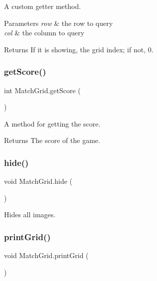 A custom getter method. 


\begin{DoxyParams}{Parameters}
{\em row} & the row to query \\
\hline
{\em col} & the column to query \\
\hline
\end{DoxyParams}
\begin{DoxyReturn}{Returns}
If it is showing, the grid index; if not, 0. 
\end{DoxyReturn}
\mbox{\label{class_match_grid_a39fcc7cc9b094d95d2aee459c9e287df}} 
\subsubsection{\texorpdfstring{get\+Score()}{getScore()}}
{\footnotesize\ttfamily int Match\+Grid.\+get\+Score (\begin{DoxyParamCaption}{ }\end{DoxyParamCaption})}



A method for getting the score. 

\begin{DoxyReturn}{Returns}
The score of the game. 
\end{DoxyReturn}
\mbox{\label{class_match_grid_ada04481d2f01ef0011a7bb4707d2b911}} 
\subsubsection{\texorpdfstring{hide()}{hide()}}
{\footnotesize\ttfamily void Match\+Grid.\+hide (\begin{DoxyParamCaption}{ }\end{DoxyParamCaption})}



Hides all images. 

\mbox{\label{class_match_grid_a67c79ef33744f135e5a9b483bf5e369f}} 
\subsubsection{\texorpdfstring{print\+Grid()}{printGrid()}}
{\footnotesize\ttfamily void Match\+Grid.\+print\+Grid (\begin{DoxyParamCaption}{ }\end{DoxyParamCaption})}



